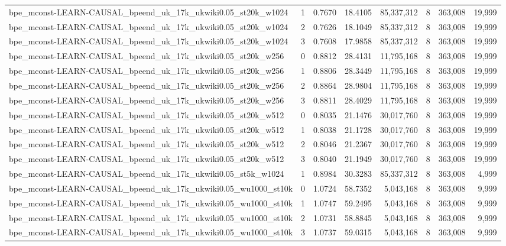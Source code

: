 \begin{tabular}{lrrrrrrr}
bpe\_mconst-LEARN-CAUSAL\_bpeend\_uk\_17k\_ukwiki0.05\_st20k\_w1024 & 1 & 0.7670 & 18.4105 & 85,337,312 & 8 & 363,008 & 19,999 \\
bpe\_mconst-LEARN-CAUSAL\_bpeend\_uk\_17k\_ukwiki0.05\_st20k\_w1024 & 2 & 0.7626 & 18.1049 & 85,337,312 & 8 & 363,008 & 19,999 \\
bpe\_mconst-LEARN-CAUSAL\_bpeend\_uk\_17k\_ukwiki0.05\_st20k\_w1024 & 3 & 0.7608 & 17.9858 & 85,337,312 & 8 & 363,008 & 19,999 \\
bpe\_mconst-LEARN-CAUSAL\_bpeend\_uk\_17k\_ukwiki0.05\_st20k\_w256 & 0 & 0.8812 & 28.4131 & 11,795,168 & 8 & 363,008 & 19,999 \\
bpe\_mconst-LEARN-CAUSAL\_bpeend\_uk\_17k\_ukwiki0.05\_st20k\_w256 & 1 & 0.8806 & 28.3449 & 11,795,168 & 8 & 363,008 & 19,999 \\
bpe\_mconst-LEARN-CAUSAL\_bpeend\_uk\_17k\_ukwiki0.05\_st20k\_w256 & 2 & 0.8864 & 28.9804 & 11,795,168 & 8 & 363,008 & 19,999 \\
bpe\_mconst-LEARN-CAUSAL\_bpeend\_uk\_17k\_ukwiki0.05\_st20k\_w256 & 3 & 0.8811 & 28.4029 & 11,795,168 & 8 & 363,008 & 19,999 \\
bpe\_mconst-LEARN-CAUSAL\_bpeend\_uk\_17k\_ukwiki0.05\_st20k\_w512 & 0 & 0.8035 & 21.1476 & 30,017,760 & 8 & 363,008 & 19,999 \\
bpe\_mconst-LEARN-CAUSAL\_bpeend\_uk\_17k\_ukwiki0.05\_st20k\_w512 & 1 & 0.8038 & 21.1728 & 30,017,760 & 8 & 363,008 & 19,999 \\
bpe\_mconst-LEARN-CAUSAL\_bpeend\_uk\_17k\_ukwiki0.05\_st20k\_w512 & 2 & 0.8046 & 21.2367 & 30,017,760 & 8 & 363,008 & 19,999 \\
bpe\_mconst-LEARN-CAUSAL\_bpeend\_uk\_17k\_ukwiki0.05\_st20k\_w512 & 3 & 0.8040 & 21.1949 & 30,017,760 & 8 & 363,008 & 19,999 \\
bpe\_mconst-LEARN-CAUSAL\_bpeend\_uk\_17k\_ukwiki0.05\_st5k\_w1024 & 1 & 0.8984 & 30.3283 & 85,337,312 & 8 & 363,008 & 4,999 \\
bpe\_mconst-LEARN-CAUSAL\_bpeend\_uk\_17k\_ukwiki0.05\_wu1000\_st10k & 0 & 1.0724 & 58.7352 & 5,043,168 & 8 & 363,008 & 9,999 \\
bpe\_mconst-LEARN-CAUSAL\_bpeend\_uk\_17k\_ukwiki0.05\_wu1000\_st10k & 1 & 1.0747 & 59.2495 & 5,043,168 & 8 & 363,008 & 9,999 \\
bpe\_mconst-LEARN-CAUSAL\_bpeend\_uk\_17k\_ukwiki0.05\_wu1000\_st10k & 2 & 1.0731 & 58.8845 & 5,043,168 & 8 & 363,008 & 9,999 \\
bpe\_mconst-LEARN-CAUSAL\_bpeend\_uk\_17k\_ukwiki0.05\_wu1000\_st10k & 3 & 1.0737 & 59.0315 & 5,043,168 & 8 & 363,008 & 9,999 \\

\end{tabular}
